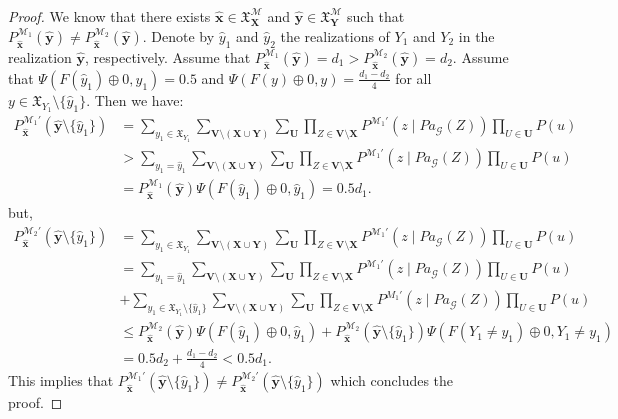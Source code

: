\documentclass[accepted]{uai2022}
\newcommand{\Pa}[2]{\textit{Pa}_{#2}(#1)}
\newcommand{\V}[0]{\mathbf{V}}
\newcommand{\U}[0]{\mathbf{U}}
\newcommand{\X}[0]{\mathbf{X}}
\newcommand{\Y}[0]{\mathbf{Y}}
\newcommand{\x}[0]{\mathbf{x}}
\newcommand{\y}[0]{\mathbf{y}}
\newcommand{\G}[0]{\mathcal{G}}
\newcommand{\M}[0]{\mathcal{M}}
\newcommand{\dom}[1]{\mathfrak{X}_{#1}}
\begin{document}
\begin{proof}
            We know that there exists $\hat{\x} \in \dom{\X}^{\M}$ and $\hat{\y} \in \dom{\Y}^{\M}$ such that $P^{\M_1}_{\hat{\x}}(\hat{\y})\neq P^{\M_2}_{\hat{\x}}(\hat{\y})$. 
            Denote by $\hat{y}_1$ and $\hat{y}_2$ the realizations of $Y_1$ and $Y_2$ in the realization $\hat{\y}$, respectively. 
            Assume that $P^{\M_1}_{\hat{\x}}(\hat{\y}) = d_1 > P^{\M_2}_{\hat{\x}}(\hat{\y}) = d_2$. 
            Assume that $\Psi(F(\hat{y}_1)\oplus 0, \hat{y}_1)=0.5$ and $\Psi(F(y)\oplus 0, y) = \frac{d_1-d_2}{4}$ for all $y \in \dom{Y_1}\setminus \{\hat{y}_1\}$. 
            Then we have:
            \begin{align*}
                P_{\hat{\x}}^{\M_1'}(\hat{\y} \setminus \{\hat{y}_1\})
                &=\sum_{y_1 \in \dom{Y_1}} \sum_{\V \setminus (\X\cup\Y)} \sum_{\U} \prod_{Z\in \V\setminus \X} P^{\M_1'}(z \mid \Pa{Z}{\G}) \prod_{U\in \U} P(u) \\
                & >\sum_{y_1 = \hat{y}_1} \sum_{\V\setminus (\X\cup\Y)} \sum_{\U} \prod_{Z\in \V\setminus \X} P^{\M_1'}(z \mid \Pa{Z}{\G}) \prod_{U\in \U} P(u) \\
                & =P_{\hat{\x}}^{\M_1}(\hat{\y}) \Psi(F(\hat{y}_1)\oplus 0, \hat{y}_1) = 0.5 d_1.
            \end{align*}
            but, 
            \begin{align*}
                P_{\hat{\x}}^{\M_2'}(\hat{\y} \setminus \{\hat{y}_1\})
                &=\sum_{y_1 \in \dom{Y_1}} \sum_{\V \setminus (\X \cup \Y)} \sum_{\U}  \prod_{Z\in \V \setminus \X} P^{\M_1'}(z \mid \Pa{Z}{\G}) \prod_{U\in \U} P(u)\\
                & =\sum_{y_1 = \hat{y}_1} \sum_{\V \setminus (\X \cup \Y )} \sum_{\U} \prod_{Z\in \V \setminus \X} P^{\M_1'}(z \mid \Pa{Z}{\G}) \prod_{U\in \U} P(u) \\
                & + \sum_{y_1 \in \dom{Y_1}\setminus \{\hat{y}_1\}} \sum_{\V \setminus (\X\cup\Y)} \sum_{\U} \prod_{Z\in \V \setminus \X} P^{M_1'}(z \mid \Pa{Z}{\G}) \prod_{U \in \U} P(u) \\
                &\leq P_{\hat{\x}}^{\M_2}(\hat{\y}) \Psi(F(\hat{y}_1)\oplus 0, \hat{y}_1) + P_{\hat{\x}}^{\M_2}(\hat{\y} \setminus \{\hat{y}_1\}) \Psi(F(Y_1\neq y_1)\oplus 0, Y_1\neq y_1)\\
                & = 0.5d_2 + \frac{d_1-d_2}{4} < 0.5d_1.
            \end{align*}
            This implies that $P_{\hat{\x}}^{\M_1'}(\hat{\y} \setminus \{\hat{y}_1\})\neq P_{\hat{\x}}^{\M_2'}(\hat{\y} \setminus \{\hat{y}_1\})$ which concludes the proof.
        \end{proof}
      
\end{document}
